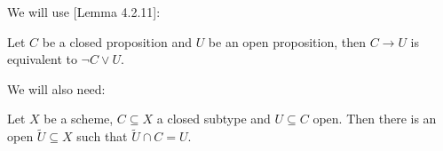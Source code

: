 
We will use \cite{draft}[Lemma 4.2.11]:

\begin{lemma}
  \label{closed-implies-open-to-or}
  Let $C$ be a closed proposition and $U$ be an open proposition,
  then $C\to U$ is equivalent to $\neg C \vee U$.
\end{lemma}

We will also need:

\begin{lemma}
  \label{commute-open-in-closed}
  Let $X$ be a scheme, $C\subseteq X$ a closed subtype and $U\subseteq C$ open.
  Then there is an open $\tilde{U}\subseteq X$ such that $\tilde{U}\cap C = U$.
\end{lemma}

